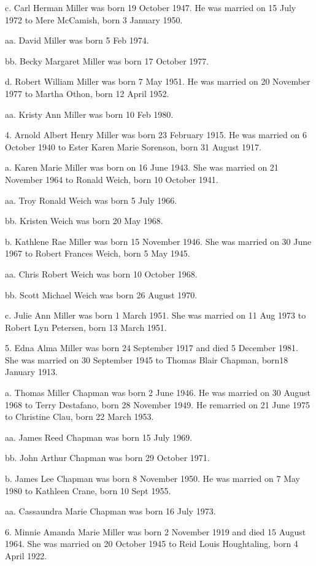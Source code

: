 \documentclass[a4paper]{article}
\begin{document}
c. Carl Herman Miller was born 19 October 1947.  He was married on 15 July 1972 to Mere McCamish, born 3 January 1950.

aa. David Miller was born 5 Feb 1974.

bb. Becky Margaret Miller was born 17 October 1977.

d. Robert William Miller was born 7 May 1951.  He was married on 20 November 1977 to Martha Othon, born 12 April 1952.
 
aa.  Kristy Ann Miller was born 10 Feb 1980.

4. Arnold Albert Henry Miller was born 23 February 1915.  He was married on 6 October 1940 to Ester Karen Marie Sorenson, born 31 August 1917.

a. Karen Marie Miller was born on 16 June 1943.  She was married on 21 November 1964 to Ronald Weich, born 10 October 1941.
 
aa. Troy Ronald Weich was born 5 July 1966.

bb. Kristen Weich was born 20 May 1968.

b. Kathlene Rae Miller  was born 15 November 1946.  She was married on 30 June 1967 to Robert Frances Weich, born 5 May 1945.
 
aa. Chris Robert Weich was born 10 October 1968.

bb. Scott Michael Weich was born 26 August 1970.

c. Julie Ann Miller was born 1 March 1951.  She was married on 11 Aug 1973 to Robert Lyn Petersen, born 13 March 1951.
 
5. Edna Alma Miller was born 24 September 1917 and died 5 December 1981. She was married on 30 September 1945 to Thomas Blair Chapman, born18 January 1913.
 
a. Thomas Miller Chapman was born 2 June 1946.  He was married on 30 August 1968 to Terry Destafano, born 28 November 1949.  He remarried on 21 June 1975 to Christine Clau, born 22 March 1953.  
			
aa. James Reed Chapman was born 15 July 1969.

bb. John Arthur Chapman was born 29 October 1971.

b. James Lee Chapman was born 8 November 1950.  He was married on 7 May 1980 to Kathleen Crane, born 10 Sept 1955.
 
aa. Cassaundra Marie Chapman was born 16 July 1973.

6. Minnie Amanda Marie Miller was born 2 November 1919 and died 15 August 1964.  She was married on 20 October 1945 to Reid Louis Houghtaling, born 4 April 1922. 
\end{document}
